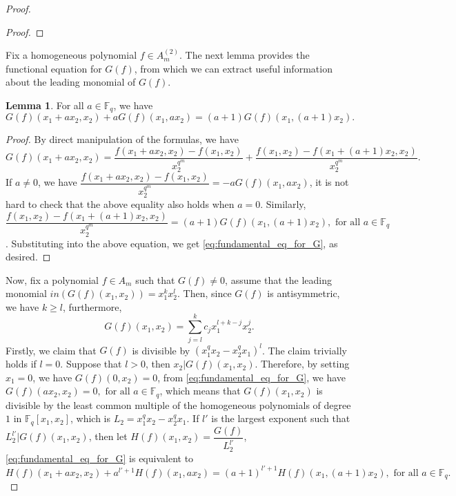 \documentclass[12pt,a4paper]{report}
\theoremstyle{definition}
\newtheorem{lemma}[theorem]{Lemma}
\theoremstyle{remark}
\theoremstyle{definition}
\begin{document}
\begin{proof}
\begin{proof}
\end{proof}
Fix a homogeneous polynomial $f\in A_m^{(2)}$. The next lemma provides the functional equation for $G(f)$, from which we can extract useful information about the leading monomial of $G(f)$.
\begin{lemma}
    For all $a\in \mathbb{F}_q$, we have
    \begin{equation}\label{eq:fundamental_eq_for_G}
        G(f)(x_1+ax_2, x_2) + aG(f)(x_1, ax_2) = (a+1)G(f)(x_1, (a+1)x_2).
    \end{equation}
\end{lemma}
\begin{proof}
    By direct manipulation of the formulas, we have
\begin{equation*}
    G(f)(x_1+ax_2, x_2)  = \dfrac{f(x_1+ax_2, x_2) - f(x_1, x_2)}{x_2^{q^m}} + \dfrac{f(x_1, x_2) - f(x_1+(a+1)x_2, x_2)}{x_2^{q^m}}.
\end{equation*}
If $a\neq 0$, we have $\dfrac{f(x_1+ax_2, x_2) - f(x_1, x_2)}{x_2^{q^m}} = -aG(f)(x_1, ax_2)$, it is not hard to check that the above equality also holds when $a=0$. Similarly, $\dfrac{f(x_1, x_2) - f(x_1+(a+1)x_2, x_2)}{x_2^{q^m}} = (a+1)G(f)(x_1, (a+1)x_2), \text{ for all } a\in \mathbb{F}_q$. Substituting into the above equation, we get \eqref{eq:fundamental_eq_for_G}, as desired. 
\end{proof}
Now, fix a polynomial $f\in A_m$ such that $G(f)\neq 0$, assume that the leading monomial $in(G(f)(x_1, x_2)) = x_1^k x_2^l$. Then, since $G(f)$ is antisymmetric, we have $k\geq l$, furthermore,
\begin{equation*}
    G(f)(x_1, x_2) = \sum\limits_{j = l}^{k} c_j x_1^{l+k-j}x_2^{j}.
\end{equation*}
Firstly, we claim that $G(f)$ is divisible by $(x_1^q x_2 - x_2^q x_1)^{l}$. The claim trivially holds if $l=0$. Suppose that $l>0$, then $x_2 | G(f)(x_1, x_2)$. Therefore, by setting $x_1 = 0$, we have $G(f)(0, x_2) = 0$, from \eqref{eq:fundamental_eq_for_G}, we have $G(f)(ax_2, x_2) = 0, \text{ for all } a\in \mathbb{F}_q$, which means that $G(f)(x_1, x_2)$ is divisible by the least common multiple of the homogeneous polynomials of degree $1$ in $\mathbb{F}_q[x_1, x_2]$, which is $L_2 = x_1^q x_2 - x_2^q x_1$. If $l'$ is the largest exponent such that $L_2^{l'}|G(f)(x_1, x_2)$, then let $H(f)(x_1, x_2) = \dfrac{G(f)}{L_2^{l'}}$, \eqref{eq:fundamental_eq_for_G} is equivalent to
\begin{equation*}
    H(f)(x_1+ax_2, x_2) + a^{l'+1}H(f)(x_1, ax_2) = (a+1)^{l'+1}H(f)(x_1, (a+1)x_2), \text{ for all } a\in \mathbb{F}_q.

\end{equation*}
\end{proof}
\end{document}
